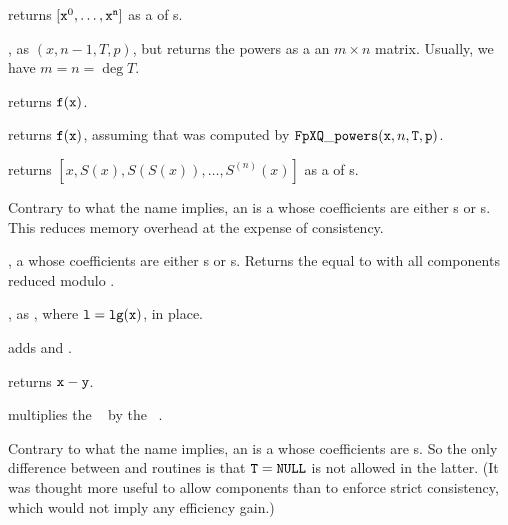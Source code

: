  returns $[{\tt x}^0,
\dots, {\tt x}^{\tt n}]$ as a  of s.

, as
$(x, n-1, T, p)$, but returns the powers as a an
$m\times n$ matrix. Usually, we have $m = n = \deg T$.

 returns
${\tt f}({\tt x})$.

 returns
${\tt f}({\tt x})$, assuming that  was computed by
${\tt FpXQ\_powers}({\tt x}, n, {\tt T}, {\tt p})$.

 returns
$[x,S(x),S(S(x)),\dots,S^{(n)}(x)]$ as a  of s.

Contrary to what the name implies, an  is a  whose
coefficients are either s or s. This reduces memory
overhead at the expense of consistency.

,  a  whose coefficients are
either s or s. Returns the  equal to  with
all components reduced modulo .

, as , where
${\tt l} = {\tt lg(x)}$, in place.

 adds  and .

 returns ${\tt x}-{\tt y}$.

 multiplies the ~
by the ~.

Contrary to what the name implies, an  is a  whose
coefficients are s. So the only difference between  and
 routines is that ${\tt T} = {\tt NULL}$ is not allowed in the
latter. (It was thought more useful to allow  components than to
enforce strict consistency, which would not imply any efficiency gain.)






